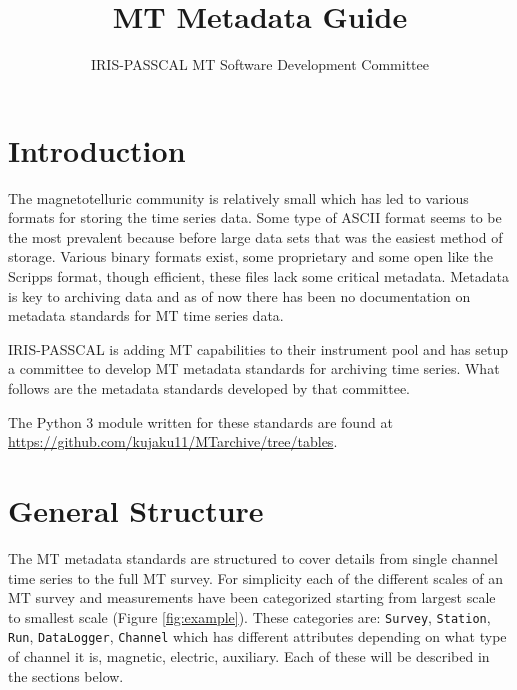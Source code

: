 \documentclass{article}
\title{MT Metadata Guide}
\author[1]{IRIS-PASSCAL MT Software Development Committee}
\affil[1]{IRIS}
\begin{document}
	
\maketitle

\tableofcontents

\newpage

\section{Introduction}

The magnetotelluric community is relatively small which has led to various formats for storing the time series data.  Some type of ASCII format seems to be the most prevalent because before large data sets that was the easiest method of storage. Various binary formats exist, some proprietary and some open like the Scripps format, though efficient, these files lack some critical metadata.  Metadata is key to archiving data and as of now there has been no documentation on metadata standards for MT time series data.  

IRIS-PASSCAL is adding MT capabilities to their instrument pool and has setup a committee to develop MT metadata standards for archiving time series.  What follows are the metadata standards developed by that committee.

The Python 3 module written for these standards are found at \url{https://github.com/kujaku11/MTarchive/tree/tables}.

\section{General Structure}

The MT metadata standards are structured to cover details from single channel time series to the full MT survey.  For simplicity each of the different scales of an MT survey and measurements have been categorized starting from largest scale to smallest scale (Figure \ref{fig:example}).  These categories are: \verb|Survey|, \verb|Station|, \verb|Run|, \verb|DataLogger|, \verb|Channel| which has different attributes depending on what type of channel it is, magnetic, electric, auxiliary.  Each of these will be described in the sections below.  
\end{document}
